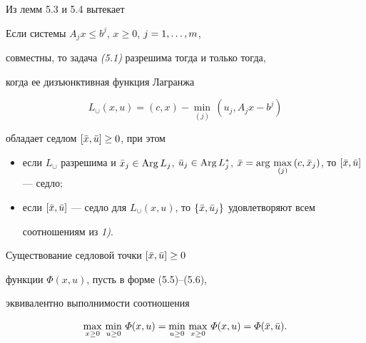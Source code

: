 Из лемм 5.3 и 5.4 вытекает





\begin{thms}


Если системы $A_j x \le b^j$, $x \ge 0$, $j=1,\dotsc,m$,


совместны, то задача {\em (5.1)} разрешима тогда и только тогда,


когда ее дизъюнктивная функция Лагранжа


$$


L_{\cup} (x, u) = (c, x) -\min_{(j)}\, (u_j, A_j x - b^j)


$$


обладает седлом $[ \Bar{x}, \Bar{u} ] \ge 0$, при этом


\begin{itemize}


\item[1)] если $L_{\cup}$ разрешима и $\Bar{x}_j \in


\Arg L_j$, $\Bar{u}_j \in \Arg L_j^*$, $\Bar{x} =


\arg\, \max\limits_{(j)}\, (c, \Bar{x}_j)$, то $[ \Bar{x},


\Bar{u} ]$ --- седло$;$


\item[2)] если $[ \Bar{x}, \Bar{u} ]$ --- седло для $L_{\cup}


(x, u)$, то $\{ \Bar{x}, \Bar{u}_j \}$ удовлетворяют всем


соотношениям из {\em 1)}.


\end{itemize}


\end{thms}





Существование седловой точки $[ \Bar{x}, \Bar{u} ] \ge 0$


функции $\varPhi (x, u)$, пусть в форме (5.5)--(5.6),


эквивалентно выполнимости соотношения


\begin{equation}


\max_{x \ge 0}\, \min_{u \ge 0}\, \varPhi (x, u) = \min_{u


\ge 0}\, \max_{x \ge 0}\, \varPhi (x, u) = \varPhi (\Bar{x},


\Bar{u}).


\end{equation}





